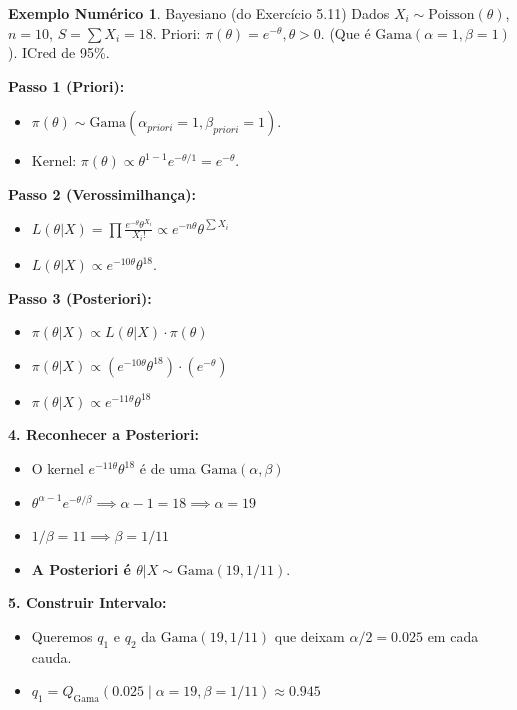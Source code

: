 \documentclass[12pt, a4paper]{article}
\theoremstyle{definition} %
\newtheorem{exemplo}{Exemplo Numérico}[section]
\theoremstyle{remark} %
\begin{document}
\begin{exemplo}{Bayesiano (do Exercício 5.11)}
    Dados $X_i \sim \text{Poisson}(\theta)$, $n=10$, $S = \sum X_i = 18$.
    Priori: $\pi(\theta) = e^{-\theta}, \theta > 0$. (Que é $\text{Gama}(\alpha=1, \beta=1)$).
    ICred de 95\%.

    \textbf{Passo 1 (Priori):}
    \begin{itemize}
        \item $\pi(\theta) \sim \text{Gama}(\alpha_{priori}=1, \beta_{priori}=1)$.
        \item Kernel: $\pi(\theta) \propto \theta^{1-1} e^{-\theta/1} = e^{-\theta}$.
    \end{itemize}
    \textbf{Passo 2 (Verossimilhança):}
    \begin{itemize}
        \item $L(\theta|X) = \prod \frac{e^{-\theta}\theta^{X_i}}{X_i!} \propto e^{-n\theta} \theta^{\sum X_i}$
        \item $L(\theta|X) \propto e^{-10\theta} \theta^{18}$.
    \end{itemize}
    \textbf{Passo 3 (Posteriori):}
    \begin{itemize}
        \item $\pi(\theta | X) \propto L(\theta | X) \cdot \pi(\theta)$
        \item $\pi(\theta | X) \propto (e^{-10\theta} \theta^{18}) \cdot (e^{-\theta})$
        \item $\pi(\theta | X) \propto e^{-11\theta} \theta^{18}$
    \end{itemize}
    \textbf{4. Reconhecer a Posteriori:}
    \begin{itemize}
        \item O kernel $e^{-11\theta} \theta^{18}$ é de uma $\text{Gama}(\alpha, \beta)$
        \item $\theta^{\alpha-1} e^{-\theta/\beta} \implies \alpha-1 = 18 \implies \alpha = 19$
        \item $1/\beta = 11 \implies \beta = 1/11$
        \item \textbf{A Posteriori é $\theta|X \sim \text{Gama}(19, 1/11)$}.
    \end{itemize}
    \textbf{5. Construir Intervalo:}
    \begin{itemize}
        \item Queremos $q_1$ e $q_2$ da $\text{Gama}(19, 1/11)$ que deixam $\alpha/2=0.025$ em cada cauda.
        \item $q_1 = Q_{\text{Gama}}(0.025 \mid \alpha=19, \beta=1/11) \approx 0.945$

\end{itemize}
\end{exemplo}
\end{document}
